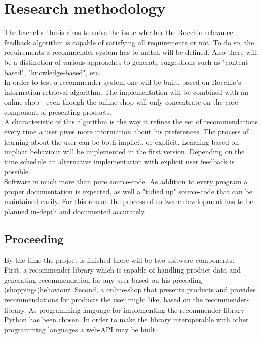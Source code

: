 


\section{Research methodology}

The bachelor thesis aims to solve the issue whether the Rocchio relevance feedback algorithm is capable of satisfying all requirements or not.
To do so, the requirements a recommender system has to match will be defined.
Also there will be a distinction of various approaches to generate suggestions such as "content-based", "knowledge-based", etc.\\
In order to test a recommender system one will be built, based on Rocchio's information retrieval algorithm.
The implementation will be combined with an online-shop - even though the online shop will only concentrate on the core-component of presenting products.\\
A characteristic of this algorithm is the way it refines the set of recommendations every time a user gives more information about his preferences.\citep[p. 92]{lops:11}
The process of learning about the user can be both implicit, or explicit.
Learning based on implicit behaviour will be implemented in the first version.
Depending on the time schedule an alternative implementation with explicit user feedback is possible.\\

Software is much more than pure source-code.
As addition to every program a proper documentation is expected, as well a "tidied up" source-code that can be maintained easily.
For this reason the process of software-development has to be planned in-depth and documented accurately.


\subsection{Proceeding}
By the time the project is finished there will be two software-components.\\
First, a recommender-library which is capable of handling product-data and generating recommendation for any user based on his preceding (shopping-)behaviour.
Second, a online-shop that presents products and provides recommendations for products the user might like, based on the recommender-library.
As programming language for implementing the recommender-library Python has been chosen.
In order to make the library interoperable with other programming languages a web-API may be built.

